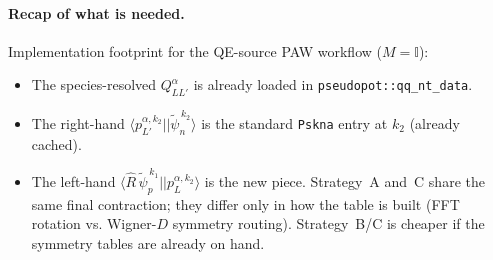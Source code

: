 \documentclass[11pt]{article}
\newcommand{\matel}[3]{\langle #1 | #2 | #3 \rangle}
\newcommand{\rotpsipt}[2]{\hat{R}\,\widetilde{\psi}_{#1}^{\,#2}}
\newcommand{\psipt}[2]{\widetilde{\psi}_{#1}^{\,#2}}
\begin{document}
\paragraph{Recap of what is needed.} Implementation footprint for the
QE-source PAW workflow ($M = \mathbb{I}$):
\begin{itemize}
  \item The species-resolved $Q^{\alpha}_{LL'}$ is already loaded in
        \texttt{pseudopot::qq\_nt\_data}.
  \item The right-hand $\matel{p_{L'}^{\alpha, k_2}}{}{\psipt{n}{k_2}}$
        is the standard \texttt{Pskna} entry at $k_2$ (already cached).
  \item The left-hand $\matel{\rotpsipt{p}{k_1}}{}{p_L^{\alpha, k_2}}$
        is the new piece. Strategy~A and~C share the same final
        contraction; they differ only in how the table is built (FFT
        rotation vs. Wigner-$D$ symmetry routing). Strategy~B/C is
        cheaper if the symmetry tables are already on hand.
\end{itemize}
\end{document}
